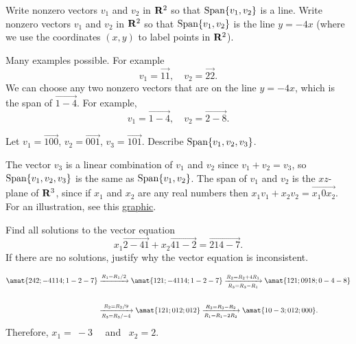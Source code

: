 \begin{problems}
\problem %
\begin{subproblems}
  \subproblem Write nonzero vectors $v_1$ and $v_2$ in ${\bf R}^2$ so
  that $\textup{Span}\{v_1, v_2\}$ is a line.%
  \subproblem Write nonzero vectors $v_1$ and $v_2$ in ${\bf R}^2$ so
  that $\textup{Span}\{v_1, v_2\}$ is the line $y = -4x$ (where we use
  the coordinates $(x, y)$ to label points in ${\bf R}^2$).
\end{subproblems}

\begin{solution}
  \begin{subproblems}
    \subproblem Many examples possible.  For example
    \[v_1 = \vec{1 1}, \quad v_2 = \vec{2 2}.\] %
    \subproblem We can choose any two nonzero vectors that are on the
    line $y = -4x$, which is the span of $\vec{1 -4}$.  For example,
    \[v_1 = \vec{1 -4}, \quad v_2 = \vec{2 -8}.\]
  \end{subproblems}
\end{solution}

\problem
Let $v_1 = \vec{1 0 0}$, $v_2 = \vec{0 0 1}$, $v_3 = \vec{1 0 1}$.
Describe $\textup{Span}\{v_1, v_2, v_3\}$.

\begin{solution}
  The vector $v_3$ is a linear combination of $v_1$ and $v_2$ since
  $v_1 + v_2 = v_3$, so $\textup{Span}\{v_1, v_2, v_3\}$ is the same
  as $\textup{Span}\{v_1, v_2\}$.  The span of $v_1$ and $v_2$ is the
  $xz$-plane of ${\bf R}^3$, since if $x_1$ and $x_2$ are any real
  numbers then $x_1 v_1 + x_2 v_2 = \vec{x_1 0 x_2}$.  For an
  illustration, see this {\color{blue}
    \href{https://textbooks.math.gatech.edu/ila/1553/demos/spans.html?v1=1,0,0&v2=0,0,1&target=1,0,1&range=3}{graphic}}.
\end{solution}

\problem %
Find all solutions to the vector equation
\[x_1 \vec{2 -4 1} + x_2 \vec{4 1 -2} = \vec{2 14 -7}.\] If there are
no solutions, justify why the vector equation is inconsistent.

\begin{solution}
\begin{align*}
  \amat{2 4 2; -4 1 14; 1 -2 -7}
  & \xrightarrow[]{R_1=R_1/2} \amat{1 2 1; -4 1 14; 1 -2 -7} 
\xrightarrow[R_3=R_3-R_1]{R_2=R_2+4R_1} \amat{1 2 1; 0 9 18; 0 -4 -8}
  \\  \\
  & \xrightarrow[R_3=R_3/-4]{R_2=R_2/9} \amat{1 2 1; 0 1 2; 0 1 2} 
 \xrightarrow[R_1=R_1-2R_2]{R_3=R_3-R_2} \amat{1 0 -3; 0 1 2; 0 0 0}.
\end{align*}
Therefore, $x_1= \ -3$ \ \ and \ $x_2=2$.
\end{solution}


\end{problems}
